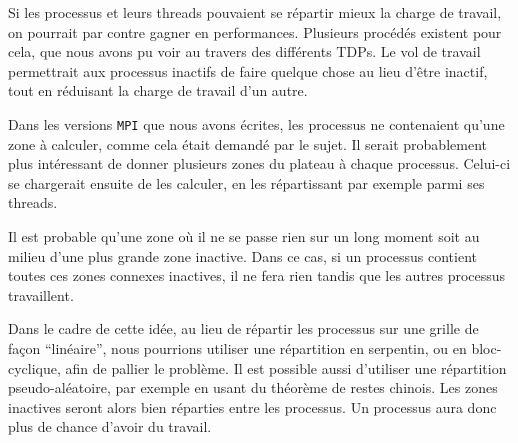 Si les processus et leurs threads pouvaient se répartir mieux la charge de travail, on pourrait par contre gagner en performances. Plusieurs procédés existent pour cela, que nous avons pu voir au travers des différents TDPs. Le vol de travail permettrait aux processus inactifs de faire quelque chose au lieu d'être inactif, tout en réduisant la charge de travail d'un autre. 

Dans les versions \texttt{MPI} que nous avons écrites, les processus ne contenaient qu'une zone à calculer, comme cela était demandé par le sujet. Il serait probablement plus intéressant de donner plusieurs zones du plateau à chaque processus. Celui-ci se chargerait ensuite de les calculer, en les répartissant par exemple parmi ses threads. 

Il est probable qu'une zone où il ne se passe rien sur un long moment soit au milieu d'une plus grande zone inactive. Dans ce cas, si un processus contient toutes ces zones connexes inactives, il ne fera rien tandis que les autres processus travaillent.

Dans le cadre de cette idée, au lieu de répartir les processus sur une grille de façon ``linéaire'', nous pourrions utiliser une répartition en serpentin, ou en bloc-cyclique, afin de pallier le problème. Il est possible aussi d'utiliser une répartition pseudo-aléatoire, par exemple en usant du théorème de restes chinois. Les zones inactives seront alors bien réparties entre les processus. Un processus aura donc plus de chance d'avoir du travail. 

